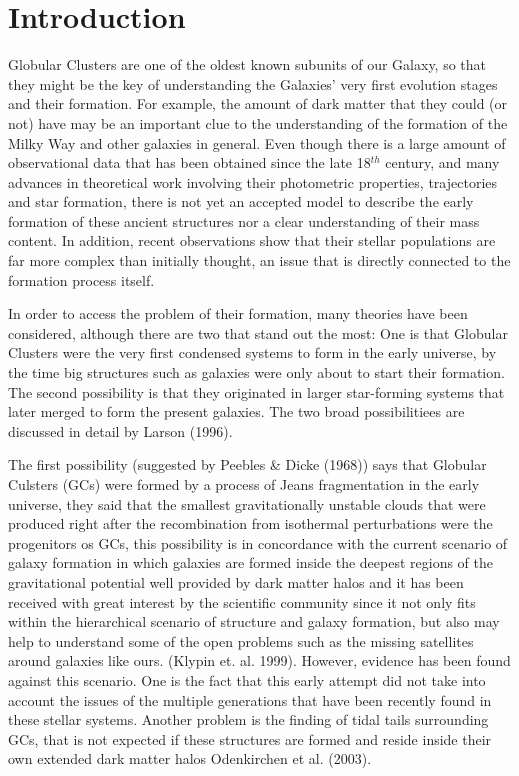 \chapter{Introduction}

Globular Clusters are one of the oldest known subunits of our Galaxy, so that they might be the key of understanding the Galaxies' very first evolution stages and their formation. For example, the amount of dark matter that they could (or not) have may be an important clue to the understanding of the formation of the Milky Way and other galaxies in general. Even though there is a large amount of observational data that has been obtained since the late 18$^{th}$ century, and many advances in theoretical work involving their photometric properties, trajectories and star formation, there is not yet an accepted model to describe the early formation of these ancient structures nor a clear understanding of their mass content. In addition, recent observations show that their stellar populations are far more complex than initially thought, an issue that is directly connected to the formation process itself. 

In order to access the problem of their formation, many theories have been considered, although there are two that stand out the most: One is that Globular Clusters were the very first condensed systems to form in the early universe, by the time big structures such as galaxies were only about to start their formation. The second possibility is that they originated in larger star-forming systems that later merged to form the present galaxies. The two broad possibilitiees are discussed in detail by Larson (1996).

The first possibility (suggested by Peebles \& Dicke (1968)) says that Globular Culsters (GCs) were formed by a process of Jeans fragmentation in the early universe, they said that the smallest gravitationally unstable clouds that were produced right after the recombination from isothermal perturbations were the progenitors os GCs, this possibility is in concordance with the current scenario of galaxy formation in which galaxies are formed inside the deepest regions of the gravitational potential well provided by dark matter halos and it has been received with great interest by the scientific community since it not only fits within the hierarchical scenario of structure and galaxy formation, but also may help to understand some of the open problems such as the missing satellites around galaxies like ours. (Klypin et. al. 1999). However, evidence has been found against this scenario. One is the fact that this early attempt did not take into account the issues of the multiple generations that have been recently found in these stellar systems. Another problem is the finding of tidal tails surrounding GCs, that is not expected if these structures are formed and reside inside their own extended dark matter halos Odenkirchen et al. (2003).

